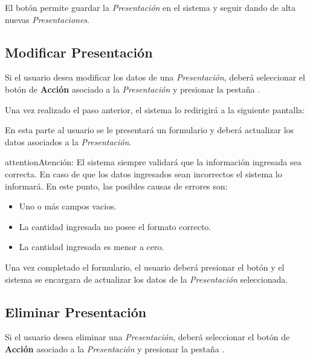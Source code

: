 \documentclass[a4paper,10pt,spanish]{sphinxmanual}
\begin{document}
El botón  permite guardar la \emph{Presentación} en el sistema y seguir dando de alta nuevas \emph{Presentaciones}.


\subsection{Modificar Presentación}
\label{presentaciones:modificar-presentacion}\label{presentaciones:id2}
Si el usuario desea modificar los datos de una \emph{Presentación}, deberá seleccionar el botón de \textbf{Acción} asociado a la \emph{Presentación} y presionar la pestaña .


Una vez realizado el paso anterior, el sistema lo redirigirá a la siguiente pantalla:


En esta parte al usuario se le presentará un formulario y deberá actualizar los datos asociados a la \emph{Presentación}.

\begin{notice}{attention}{Atención:}
El sistema siempre validará que la información ingresada sea correcta. En caso de que los datos ingresados sean incorrectos el sistema lo informará.
En este punto, las posibles causas de errores son:
\begin{itemize}
\item {} 
Uno o más campos vacios.

\item {} 
La cantidad ingresada no posee el formato correcto.

\item {} 
La cantidad ingresada es menor a cero.

\end{itemize}
\end{notice}

Una vez completado el formulario, el usuario deberá presionar el botón  y el sistema se encargara de actualizar los datos de la \emph{Presentación} seleccionada.


\subsection{Eliminar Presentación}
\label{presentaciones:id3}\label{presentaciones:eliminar-presentacion}
Si el usuario desea eliminar una \emph{Presentación}, deberá seleccionar el botón de \textbf{Acción} asociado a la \emph{Presentación} y presionar la pestaña .
\end{document}
